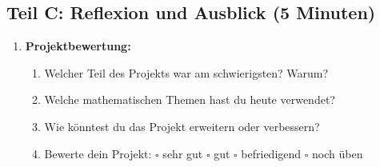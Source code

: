 \subsection*{Teil C: Reflexion und Ausblick (5 Minuten)}

\begin{enumerate}[label=\arabic*.,resume]

    \item \textbf{Projektbewertung:}

    \begin{enumerate}[label=\alph*)]
        \item Welcher Teil des Projekts war am schwierigsten? Warum?

        \vspace{1.5cm}

        \item Welche mathematischen Themen hast du heute verwendet?

        \vspace{1.5cm}

        \item Wie könntest du das Projekt erweitern oder verbessern?

        \vspace{1.5cm}

        \item Bewerte dein Projekt: \hspace{0.5cm} $\square$ sehr gut \hspace{0.5cm} $\square$ gut \hspace{0.5cm} $\square$ befriedigend \hspace{0.5cm} $\square$ noch üben

    \end{enumerate}

\end{enumerate}